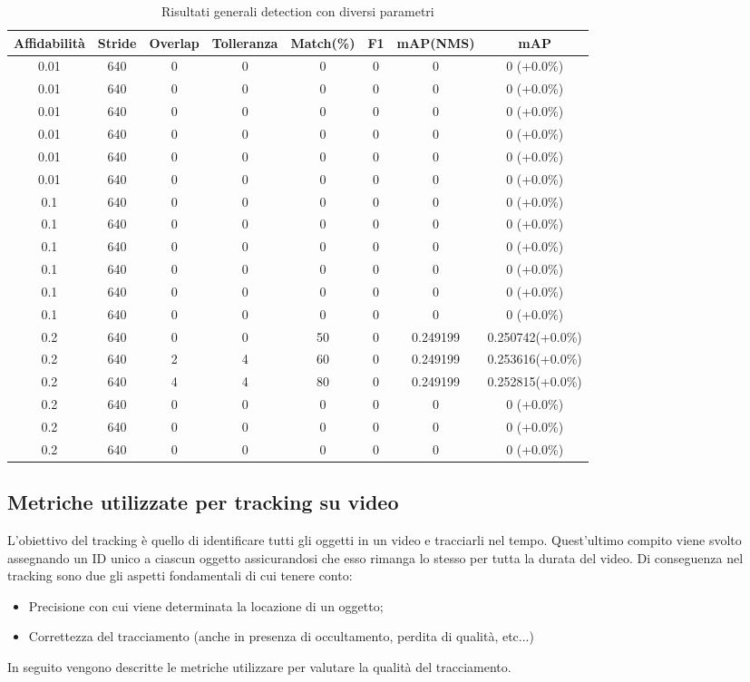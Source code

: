 \begin{table}[h!]
\centering
\begin{tabular}{|c|c|c|c|c|c|c|c|} 
\hline
Affidabilità & Stride & Overlap & Tolleranza & Match(\%) & F1 & mAP(NMS) & mAP\\ [0.5ex] 
\hline
0.01 & 640 & 0 & 0 & 0 & 0 & 0 & 0 (+0.0\%)\\
0.01 & 640 & 0 & 0 & 0 & 0 & 0 & 0 (+0.0\%)\\
0.01 & 640 & 0 & 0 & 0 & 0 & 0 & 0 (+0.0\%)\\
0.01 & 640 & 0 & 0 & 0 & 0 & 0 & 0 (+0.0\%)\\
0.01 & 640 & 0 & 0 & 0 & 0 & 0 & 0 (+0.0\%)\\
0.01 & 640 & 0 & 0 & 0 & 0 & 0 & 0 (+0.0\%)\\
0.1 & 640 & 0 & 0 & 0 & 0 & 0 & 0 (+0.0\%)\\
0.1 & 640 & 0 & 0 & 0 & 0 & 0 & 0 (+0.0\%)\\
0.1 & 640 & 0 & 0 & 0 & 0 & 0 & 0 (+0.0\%)\\
0.1 & 640 & 0 & 0 & 0 & 0 & 0 & 0 (+0.0\%)\\
0.1 & 640 & 0 & 0 & 0 & 0 & 0 & 0 (+0.0\%)\\
0.1 & 640 & 0 & 0 & 0 & 0 & 0 & 0 (+0.0\%)\\
0.2 & 640 & 0 & 0 & 50 & 0 & 0.249199 & 0.250742(+0.0\%)\\
0.2 & 640 & 2 & 4 & 60 & 0 & 0.249199 & 0.253616(+0.0\%)\\
0.2 & 640 & 4 & 4 & 80 & 0 & 0.249199 & 0.252815(+0.0\%)\\
0.2 & 640 & 0 & 0 & 0 & 0 & 0 & 0 (+0.0\%)\\
0.2 & 640 & 0 & 0 & 0 & 0 & 0 & 0 (+0.0\%)\\
0.2 & 640 & 0 & 0 & 0 & 0 & 0 & 0 (+0.0\%)\\
\hline
\end{tabular}
\caption{Risultati generali detection con diversi parametri}
\label{lista risultati}
\end{table}

\subsection{Metriche utilizzate per tracking su video}
L'obiettivo del tracking è quello di identificare tutti gli oggetti in un video e tracciarli nel tempo. Quest'ultimo compito viene svolto assegnando un ID unico a ciascun oggetto assicurandosi che esso rimanga lo stesso per tutta la durata del video. Di conseguenza nel tracking sono due gli aspetti fondamentali di cui tenere conto:
\begin{itemize}
\item Precisione con cui viene determinata la locazione di un oggetto;
\item Correttezza del tracciamento (anche in presenza di occultamento, perdita di qualità, etc...)
\end{itemize}
In seguito vengono descritte le metriche utilizzare per valutare la qualità del tracciamento.

